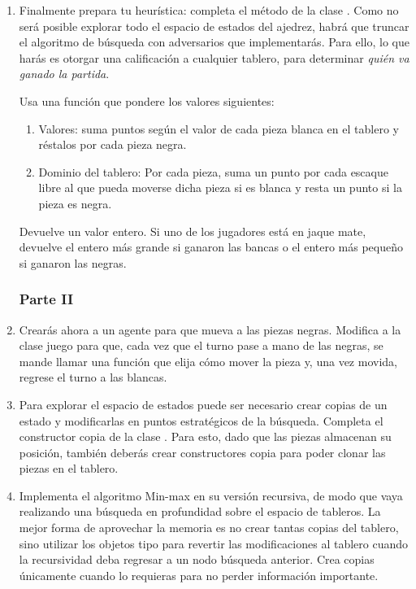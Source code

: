 \begin{enumerate}
 \item Finalmente prepara tu heurística: completa el método  de la clase .  Como no será posible explorar todo el espacio de estados del ajedrez, habrá que truncar el algoritmo de búsqueda con adversarios que implementarás.  Para ello, lo que harás es otorgar una calificación a cualquier tablero, para determinar \textit{quién va ganado la partida}.

 Usa una función que pondere los valores siguientes:
 \begin{enumerate}
  \item Valores: suma puntos según el valor de cada pieza blanca en el tablero y réstalos por cada pieza negra.

  \item Dominio del tablero:  Por cada pieza, suma un punto por cada escaque libre al que pueda moverse dicha pieza si es blanca y resta un punto si la pieza es negra.
 \end{enumerate}

 Devuelve un valor entero.  Si uno de los jugadores está en jaque mate, devuelve el entero más grande si ganaron las bancas o el entero más pequeño si ganaron las negras.
       
\subsubsection{Parte II}

 \item Crearás ahora a un agente para que mueva a las piezas negras.  Modifica a la clase juego para que, cada vez que el turno pase a mano de las negras, se mande llamar una función que elija cómo mover la pieza y, una vez movida, regrese el turno a las blancas.

 \item Para explorar el espacio de estados puede ser necesario crear copias de un estado y modificarlas en puntos estratégicos de la búsqueda.  Completa el constructor copia de la clase .  Para esto, dado que las piezas almacenan su posición, también deberás crear constructores copia para poder clonar las piezas en el tablero.

 \item Implementa el algoritmo Min-max en su versión recursiva, de modo que vaya realizando una búsqueda en profundidad sobre el espacio de tableros.  La mejor forma de aprovechar la memoria es no crear tantas copias del tablero, sino utilizar los objetos tipo  para revertir las modificaciones al tablero cuando la recursividad deba regresar a un nodo búsqueda anterior.  Crea copias únicamente cuando lo requieras para no perder información importante.


\end{enumerate}
